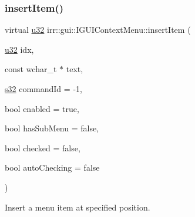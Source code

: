 \subsubsection{\texorpdfstring{insert\+Item()}{insertItem()}\hspace{0.1cm}{\footnotesize\ttfamily [2/2]}}
{\footnotesize\ttfamily virtual \hyperlink{namespaceirr_a0416a53257075833e7002efd0a18e804}{u32} irr\+::gui\+::\+I\+G\+U\+I\+Context\+Menu\+::insert\+Item (\begin{DoxyParamCaption}\item[{\hyperlink{namespaceirr_a0416a53257075833e7002efd0a18e804}{u32}}]{idx,  }\item[{const wchar\+\_\+t $\ast$}]{text,  }\item[{\hyperlink{namespaceirr_ac66849b7a6ed16e30ebede579f9b47c6}{s32}}]{command\+Id = {\ttfamily -\/1},  }\item[{bool}]{enabled = {\ttfamily true},  }\item[{bool}]{has\+Sub\+Menu = {\ttfamily false},  }\item[{bool}]{checked = {\ttfamily false},  }\item[{bool}]{auto\+Checking = {\ttfamily false} }\end{DoxyParamCaption})\hspace{0.3cm}{\ttfamily [pure virtual]}}



Insert a menu item at specified position. 



